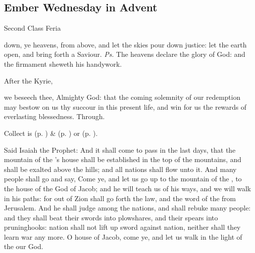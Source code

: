 \subsection{Ember Wednesday in Advent}
\begin{inhead}
{Second Class Feria}
\end{inhead}


\introit
{} down, ye heavens, from above, and let the skies pour down justice: let the earth open, and bring forth a Saviour. \textit{Ps.} The heavens declare the glory of God: and the firmament sheweth his handywork.
\begin{rubric}
    After the Kyrie,
\end{rubric}
\collect
{} we beseech thee, Almighty God: that the coming solemnity of our redemption may bestow on us thy succour in this present life, and win for us the rewards of everlasting blessedness. Through.
\begin{rubric}
     Collect is  (p. \pageref{SPMaryInAdvent}) \&   (p. \pageref{SPAgainst}) or  (p. \pageref{SPChiefBishop}).
\end{rubric}
 Said Isaiah the Prophet: And it shall come to pass in the last days, that the mountain of the 's house shall be established in the top of the mountains, and shall be exalted above the hills; and all nations shall flow unto it. And many people shall go and say, Come ye, and let us go up to the mountain of the , to the house of the God of Jacob; and he will teach us of his ways, and we will walk in his paths: for out of Zion shall go forth the law, and the word of the  from Jerusalem. And he shall judge among the nations, and shall rebuke many people: and they shall beat their swords into plowshares, and their spears into pruninghooks: nation shall not lift up sword against nation, neither shall they learn war any more. O house of Jacob, come ye, and let us walk in the light of the  our God. %
\\


